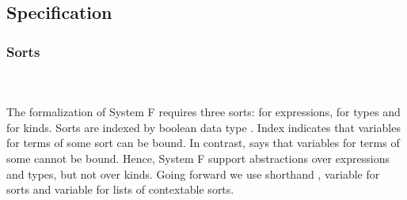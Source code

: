 \subsection{Specification}
\subsubsection{Sorts}\hfill\\\\
The formalization of System F requires three sorts:  for expressions,  for types and  for kinds. 
\FSort
Sorts are indexed by boolean data type . 
Index  indicates that variables for terms of some sort  can be bound. 
In contrast,  says that variables for terms of some  cannot be bound. 
Hence, System F support abstractions over expressions and types, but not over kinds. 
Going forward we use shorthand \FSorts, variable  for sorts and variable  for lists of contextable sorts.


